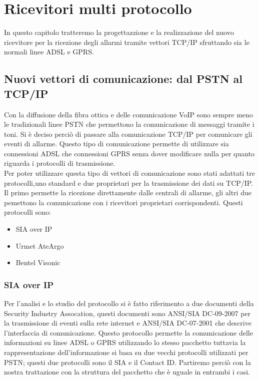 \chapter{Ricevitori multi protocollo}
\label{capitolo4}
\thispagestyle{empty}
In questo capitolo tratteremo la progettazzione e la realizzazione del nuovo  ricevitore per la ricezione degli allarmi tramite vettori TCP/IP sfruttando sia le normali linee ADSL e GPRS.
\section{Nuovi vettori di comunicazione: dal PSTN al TCP/IP}
Con la diffusione della fibra ottica e delle comunicazione VoIP sono sempre meno le tradizionali linee PSTN che permettono la comunicazione di messaggi tramite i toni. Si è deciso perciò di passare alla comunicazione TCP/IP per comunicare gli eventi di allarme. Questo tipo di comunicazione permette di utilizzare sia connessioni ADSL che connessioni GPRS senza dover modificare nulla per quanto riguarda i protocolli di trasmissione.\\
Per poter utilizzare questa tipo di vettori di comunicazione sono stati adattati tre protocolli,uno standard e due proprietari per la trasmissione dei dati su TCP/IP. Il primo permette la ricezione direttamente dalle centrali di allarme, gli altri due pemettono la comunicazione con i ricevitori proprietari corrispondenti. Questi protocolli sono:
\begin{itemize}
	\item SIA over IP
	\item Urmet AteArgo
	\item Bentel Visonic
\end{itemize}
\subsection{SIA over IP}
Per l'analisi e lo studio del protocollo si è fatto riferimento a due documenti della Security Industry Assocation, questi documenti sono ANSI/SIA DC-09-2007 per la trasmissione di eventi sulla rete internet e ANSI/SIA DC-07-2001 che descrive l'interfaccia di comunicazione.
Questo protocollo permette la comunicazione delle informazioni su linee ADSL o GPRS utilizzando lo stesso pacchetto tuttavia la rappresentazione dell'informazione si basa su due vecchi protocolli utilizzati per PSTN; questi due protocolli sono il SIA e il Contact ID. Partiremo perciò con la nostra trattazione con la struttura del pacchetto che è uguale in entrambi i casi.
